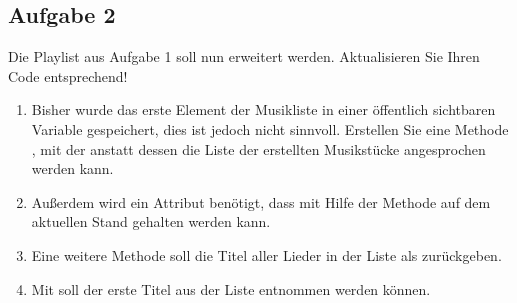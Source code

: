 \documentclass{lehramt-informatik-aufgabe}
\begin{document}
\subsection{Aufgabe 2}

Die Playlist aus Aufgabe 1 soll nun erweitert werden. Aktualisieren Sie
Ihren Code entsprechend!

\begin{enumerate}

%

\item Bisher wurde das erste Element der Musikliste in einer öffentlich
sichtbaren Variable gespeichert, dies ist jedoch nicht sinnvoll.
Erstellen Sie eine Methode , mit der anstatt dessen
die Liste der erstellten Musikstücke angesprochen werden kann.

\begin{antwort}
\end{antwort}

%

\item Außerdem wird ein Attribut  benötigt, dass mit Hilfe
der Methode  auf dem aktuellen Stand
gehalten werden kann.

\begin{antwort}
\end{antwort}

%

\item Eine weitere Methode  soll die Titel
aller Lieder in der Liste als  zurückgeben.

\begin{antwort}
\end{antwort}

%

\item Mit  soll der erste Titel aus der Liste
entnommen werden können.

\begin{antwort}
\end{antwort}


\end{enumerate}
\end{document}

